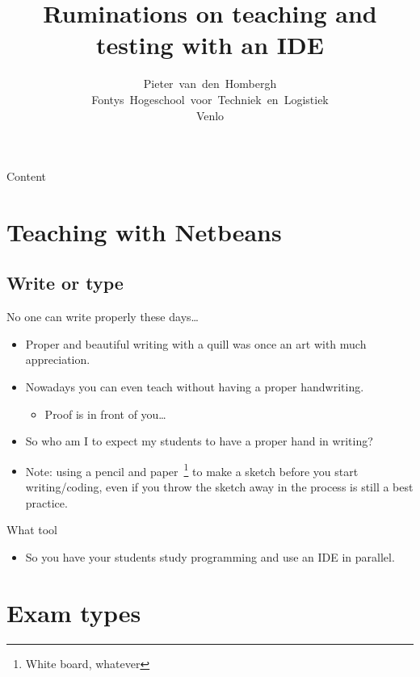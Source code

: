 \documentclass{beamer}
\author[HOM]{Pieter~van~den~Hombergh\\Fontys~Hogeschool~voor~Techniek~en~Logistiek\\Venlo}
\title{Ruminations on teaching and testing with an IDE}
\begin{document}
\frame{\titlepage}
\begin{frame}{Content}
  \tableofcontents
\end{frame}
\section{Teaching with Netbeans}
\subsection{Write or type}
\begin{frame}{No one can write properly these days\ldots}
  \begin{itemize}
  \item Proper and beautiful writing with a quill was once an art with
    much appreciation.
  \item Nowadays you can even teach without having a proper handwriting.
    \begin{itemize}
    \item Proof is in front of you\ldots
    \end{itemize}

  \item So who am I to expect my students to have a proper hand in writing?

  \item Note: using a pencil and paper~\footnote{White board, whatever} to make a sketch before you start
    writing/coding, even if you throw the sketch away in the process is
    still a best practice.
  \end{itemize}

\end{frame}

\begin{frame}{What tool}
  \begin{itemize}
  \item So you have your students study programming and use an IDE in parallel.
  \end{itemize}
\end{frame}
\section{Exam types}
\end{document}

